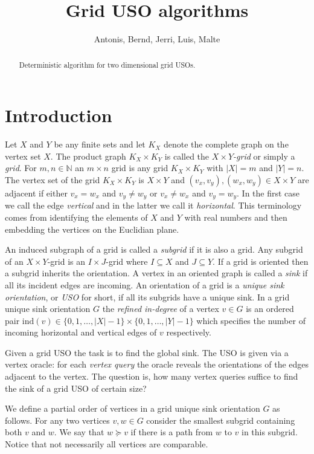 \documentclass[a4paper,10pt]{article}
\title{Grid USO algorithms}
\author{Antonis, Bernd, Jerri, Luis, Malte}
\newcommand{\indegree}{refined in-degree\xspace}
\newcommand{\ind}{\ensuremath{\mathrm{ind}}}
\begin{document}
\maketitle 

\begin{abstract}
Deterministic algorithm for two dimensional grid USOs.
\end{abstract}

\section{Introduction}

Let $X$ and $Y$ be any finite sets and let $K_X$ denote the complete graph on the vertex set $X$. The product graph $K_X\times K_Y$ is called the \emph{$X\times Y$-grid} or simply a \emph{grid}. For $m,n \in \mathbb{N}$ an $m\times n$ grid is any grid $K_X\times K_Y$ with $|X| = m$ and $|Y| = n$. The vertex set of the grid $K_X\times K_Y$ is $X\times Y$ and $(v_x,v_y),(w_x,w_y) \in X\times Y$ are adjacent if either $v_x = w_x$ and $v_y \not= w_y$ or $v_x \not= w_x$ and $v_y = w_y$. In the first case we call the edge \emph{vertical} and in the latter we call it \emph{horizontal}. This terminology comes from identifying the elements of $X$ and $Y$ with real numbers and then embedding the vertices on the Euclidian plane. 

An induced subgraph of a grid is called a \emph{subgrid} if it is also a grid. Any subgrid of an $X\times Y$-grid is an $I\times J$-grid where $I \subseteq X$ and $J \subseteq Y$. If a grid is oriented then a subgrid inherits the orientation. A vertex in an oriented graph is called a \emph{sink} if all its incident edges are incoming. An orientation of a grid is a \emph{unique sink orientation}, or \emph{USO} for short, if all its subgrids have a unique sink. In a grid unique sink orientation $G$ the \emph{\indegree} of a vertex $v \in G$ is an ordered pair $\ind (v) \in \{0,1,\ldots,|X|-1\}\times \{0,1,\ldots,|Y|-1\}$ which specifies the number of incoming horizontal and vertical edges of $v$ respectively. 

Given a grid USO the task is to find the global sink. The USO is given via a vertex oracle: for each \emph{vertex query} the oracle reveals the orientations of the edges adjacent to the vertex. The question is, how many vertex queries suffice to find the sink of a grid USO of certain size?

We define a partial order of vertices in a grid unique sink orientation $G$ as follows. For any two vertices $v,w \in G$ consider the smallest subgrid containing both $v$ and $w$. We say that $w \succeq v$ if there is a path from $w$ to $v$ in this subgrid. Notice that not necessarily all vertices are comparable.
\end{document}
